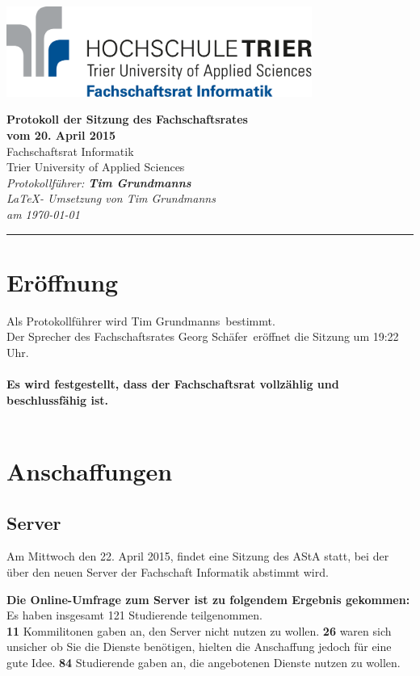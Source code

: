 \documentclass[a4paper, 11pt]{article} %
\newcommand{\protokoller}{Tim Grundmanns}
\newcommand{\dateOfMeeting}{20. April 2015}
\newcommand{\TeXer}{Tim  Grundmanns}
\newcommand{\fsiPresident}{Georg Schäfer}
\begin{document}

\doublespacing
\thispagestyle{empty}

\begin{center}
\includegraphics[width=10.0cm]{../logo_fsi.eps}

\vspace*{\fill}
{\LARGE \textbf{Protokoll der Sitzung des Fachschaftsrates \\vom \dateOfMeeting}}\\
Fachschaftsrat Informatik\\
Trier University of Applied Sciences\\
\vspace{2.5cm}
\textit{
	Protokollführer: \textbf{\protokoller} \\
	\LaTeX - Umsetzung von \TeXer\\
	am \today
}
\vfill
\end{center}

\hspace*{-35cm}
\textcolor{fsi}{\rule{64.9cm}{15pt}}
\pagebreak

\setcounter{tocdepth}{2}
\tableofcontents
\pagebreak

\section{Eröffnung}
Als Protokollführer wird \protokoller~bestimmt.\\
Der Sprecher des Fachschaftsrates \fsiPresident~eröffnet die Sitzung um 19:22 Uhr.
\\\\
\textbf{Es wird festgestellt, dass der Fachschaftsrat vollzählig und beschlussfähig ist.}
\\\\
\section{Anschaffungen}
\subsection{Server}
Am Mittwoch den 22. April 2015, findet eine Sitzung des AStA statt, bei der über den neuen Server der Fachschaft Informatik abstimmt wird.\\
\begin{flushleft}
\textbf{Die Online-Umfrage zum Server ist zu folgendem Ergebnis gekommen:}\\
Es haben insgesamt 121 Studierende teilgenommen.\\
\textbf{11} Kommilitonen gaben an, den Server nicht nutzen zu wollen. \textbf{26} waren sich unsicher ob Sie die Dienste benötigen, hielten die Anschaffung jedoch für eine gute Idee. \textbf{84} Studierende gaben an, die angebotenen Dienste nutzen zu wollen.
\end{flushleft}
\end{document}

